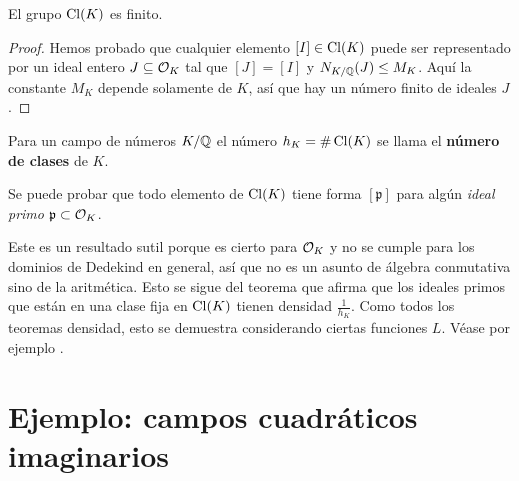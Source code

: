 \begin{teorema}
  El grupo $\operatorname{Cl} (K)$ es finito.

  \begin{proof}
    Hemos probado que cualquier elemento $[I] \in \operatorname{Cl} (K)$ puede ser
    representado por un ideal entero $J \subseteq \mathcal{O}_K$ tal que $[J] = [I]$ y
    $N_{K/\mathbb{Q}} (J) \le M_K$. Aquí la constante $M_K$ depende solamente de $K$,
    así que hay un número finito de ideales $J$.
  \end{proof}
\end{teorema}

\begin{definicion}
  Para un campo de números $K/\mathbb{Q}$ el número $h_K = \# \operatorname{Cl} (K)$ se llama el
  \textbf{número de clases} de $K$.
\end{definicion}

\begin{comentario}
  \label{com:clases-representadas-por-ideales-primos}
  Se puede probar que todo elemento de $\operatorname{Cl} (K)$ tiene forma $[\mathfrak{p}]$
  para algún \emph{ideal primo} $\mathfrak{p} \subset \mathcal{O}_K$.

  Este es un resultado sutil porque es cierto para $\mathcal{O}_K$ y no se cumple para
  los dominios de Dedekind en general, así que no es un asunto de álgebra
  conmutativa sino de la aritmética. Esto se sigue del teorema que afirma que
  los ideales primos que están en una clase fija en $\operatorname{Cl} (K)$ tienen densidad
  $\frac{1}{h_K}$. Como todos los teoremas densidad, esto se demuestra
  considerando ciertas funciones $L$. Véase por ejemplo
  \cite[\S VII.13]{Neukirch-ANT}.
\end{comentario}


\section{Ejemplo: campos cuadráticos imaginarios}
\label{sec:campos-cuadraticos-imaginarios}

